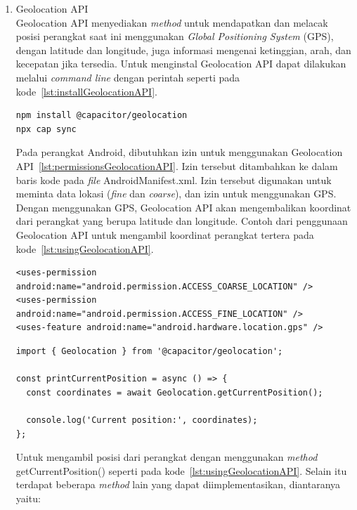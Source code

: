 \begin{enumerate}
\begin{enumerate}
			\item Geolocation API \\
			Geolocation API menyediakan \textit{method} untuk mendapatkan dan melacak posisi perangkat saat ini menggunakan \textit{Global Positioning System} (GPS), dengan latitude dan longitude, juga informasi mengenai ketinggian, arah, dan kecepatan jika tersedia. Untuk menginstal Geolocation API dapat dilakukan melalui \textit{command line} dengan perintah seperti pada kode~\ref{lst:installGeolocationAPI}.
		
\begin{lstlisting}[label={lst:installGeolocationAPI}, caption=Kode untuk Menginstal Geolocation API]
npm install @capacitor/geolocation
npx cap sync
\end{lstlisting}

		Pada perangkat Android, dibutuhkan izin untuk menggunakan Geolocation API~\ref{lst:permissionsGeolocationAPI}. Izin tersebut ditambahkan ke dalam baris kode pada \textit{file} AndroidManifest.xml. Izin tersebut digunakan untuk meminta data lokasi (\textit{fine} dan \textit{coarse}), dan izin untuk menggunakan GPS. Dengan menggunakan GPS, Geolocation API akan mengembalikan koordinat dari perangkat yang berupa latitude dan longitude. Contoh dari penggunaan Geolocation API untuk mengambil koordinat perangkat tertera pada kode~\ref{lst:usingGeolocationAPI}.

\begin{lstlisting}[label={lst:permissionsGeolocationAPI}, caption=\textit{Permissions} Geolocation API pada Android]
<uses-permission android:name="android.permission.ACCESS_COARSE_LOCATION" />
<uses-permission android:name="android.permission.ACCESS_FINE_LOCATION" />
<uses-feature android:name="android.hardware.location.gps" />
\end{lstlisting}

\begin{lstlisting}[label={lst:usingGeolocationAPI}, caption=\textit{Permissions} Geolocation API pada Android]
import { Geolocation } from '@capacitor/geolocation';

const printCurrentPosition = async () => {
  const coordinates = await Geolocation.getCurrentPosition();

  console.log('Current position:', coordinates);
};
\end{lstlisting}

		Untuk mengambil posisi dari perangkat dengan menggunakan \textit{method} getCurrentPosition() seperti pada kode~\ref{lst:usingGeolocationAPI}. Selain itu terdapat beberapa \textit{method} lain yang dapat diimplementasikan, diantaranya yaitu:
	

\end{enumerate}
\end{enumerate}
